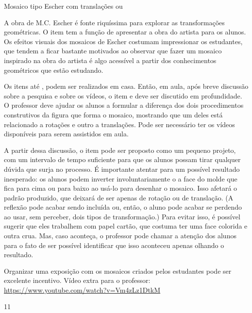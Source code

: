 \begin{sugestions}{Mosaico tipo Escher com translações ou }
{
A obra de M.C. Escher é fonte riquíssima para explorar as transformações geométricas. O item  tem a função de apresentar a obra do artista para os alunos.  Os efeitos visuais dos mosaicos de Escher costumam impressionar os estudantes, que tendem a ficar bastante motivados ao observar que fazer um mosaico inspirado na obra do artista é algo acessível a partir dos conhecimentos geométricos que estão estudando. 

Os itens  até , podem ser realizados em casa. Então, em aula, após breve discussão sobre a pesquisa e sobre os vídeos, o item e deve ser discutido em profundidade. O professor deve ajudar os alunos a formular a diferença dos dois procedimentos construtivos da figura que forma o mosaico, mostrando que um deles está relacionado a rotações e outro a translações. Pode ser necessário ter os vídeos disponíveis para serem assistidos em aula.

A partir dessa discussão, o item  pode ser proposto como um pequeno projeto, com um intervalo de tempo suficiente para que os alunos possam tirar qualquer dúvida que surja no processo. É importante atentar para um possível resultado inesperado: os alunos podem inverter involuntariamente o a face do molde que fica para cima ou para baixo ao usá-lo para desenhar o mosaico. Isso afetará o padrão produzido, que deixará de ser apenas de rotação ou de translação. (A reflexão pode acabar sendo incluída ou, então, o aluno pode acabar se perdendo ao usar, sem perceber, dois tipos de transformação.) Para evitar isso, é possível sugerir que eles trabalhem com papel cartão, que costuma ter uma face colorida e outra crua. Mas, caso aconteça, o professor pode chamar a atenção dos alunos para o fato de ser possível identificar que isso aconteceu apenas olhando o resultado.

Organizar uma exposição com os mosaicos criados pelos estudantes pode ser excelente incentivo. 
Vídeo extra para o professor: \url{https://www.youtube.com/watch?v=Vm4zLz1DtkM}
}{1}{1}
\end{sugestions}



